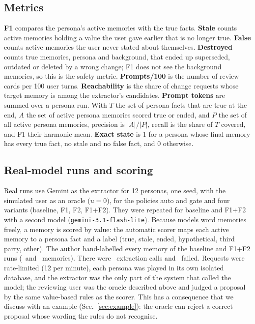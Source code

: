 \IfFileExists{IEEEtran.cls}{\documentclass[journal]{IEEEtran}\def\HAVEIEEE{1}}{\documentclass[10pt,twocolumn]{article}\usepackage[margin=0.7in,columnsep=0.25in]{geometry}}
\begin{document}
\subsection{Metrics}
\textbf{F1} compares the persona's active memories with the true facts. \textbf{Stale} counts active memories holding a value the user gave earlier that is no longer true. \textbf{False} counts active memories the user never stated about themselves. \textbf{Destroyed} counts true memories, persona and background, that ended up superseded, outdated or deleted by a wrong change; F1 does not see the background memories, so this is the safety metric. \textbf{Prompts/100} is the number of review cards per 100 user turns. \textbf{Reachability} is the share of change requests whose target memory is among the extractor's candidates. \textbf{Prompt tokens} are summed over a persona run. With $T$ the set of persona facts that are true at the end, $A$ the set of active persona memories scored true or ended, and $P$ the set of all active persona memories, precision is $|A|/|P|$, recall is the share of $T$ covered, and F1 their harmonic mean. \textbf{Exact state} is 1 for a persona whose final memory has every true fact, no stale and no false fact, and 0 otherwise.

\subsection{Real-model runs and scoring}
Real runs use Gemini as the extractor for 12 personas, one seed, with the simulated user as an oracle ($u=0$), for the policies auto and gate and four variants (baseline, F1, F2, F1+F2). They were repeated for baseline and F1+F2 with a second model (\texttt{gemini-3.1-flash-lite}). Because models word memories freely, a memory is scored by value: the automatic scorer maps each active memory to a persona fact and a label (true, stale, ended, hypothetical, third party, other). The author hand-labelled every memory of the baseline and F1+F2 runs (\agrBaseN\ and \agrBothN\ memories). There were \realExtractions\ extraction calls and \realExtractionErrors\ failed. Requests were rate-limited (12 per minute), each persona was played in its own isolated database, and the extractor was the only part of the system that called the model; the reviewing user was the oracle described above and judged a proposal by the same value-based rules as the scorer. This has a consequence that we discuss with an example (Sec.~\ref{sec:example}): the oracle can reject a correct proposal whose wording the rules do not recognise.
\end{document}

